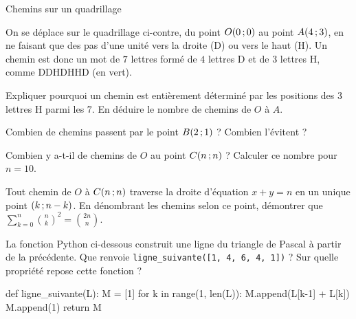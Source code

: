 \begin{exercice}[3]{Chemins sur un quadrillage}
\noindent
\begin{minipage}[t]{0.62\linewidth}\vspace{0pt}\raggedright
On se déplace sur le quadrillage ci-contre, du point $O(0\,{;}\,0)$ au point $A(4\,{;}\,3)$, en ne faisant que des pas d'une unité vers la
droite (D) ou vers le haut (H). Un chemin est donc un mot de $7$ lettres formé de $4$ lettres D et de $3$ lettres H, comme
DDHDHHD (en vert).
\end{minipage}\hfill
\begin{minipage}[t]{0.34\linewidth}\vspace{0pt}
\centering
{}
\end{minipage}
\begin{questions}
  \item Expliquer pourquoi un chemin est entièrement déterminé par les positions des $3$ lettres H parmi les $7$. En déduire le
    nombre de chemins de $O$ à $A$.
  \item Combien de chemins passent par le point $B(2\,{;}\,1)$ ? Combien l'évitent ?
  \item Combien y a-t-il de chemins de $O$ au point $C(n\,{;}\, n)$ ? Calculer ce nombre pour $n=10$.
  \item Tout chemin de $O$ à $C(n\,{;}\, n)$ traverse la droite d'équation $x+y=n$ en un unique point $(k\,{;}\, n-k)$. En dénombrant les
    chemins selon ce point, démontrer que $\displaystyle\sum_{k=0}^{n}\binom nk^{2}=\binom{2n}{n}$.
  \item La fonction Python ci-dessous construit une ligne du triangle de Pascal à partir de la précédente. Que renvoie
    \texttt{ligne\_suivante([1, 4, 6, 4, 1])} ? Sur quelle propriété repose cette fonction ?
\begin{python}
def ligne_suivante(L):
    M = [1]
    for k in range(1, len(L)):
        M.append(L[k-1] + L[k])
    M.append(1)
    return M
\end{python}
\end{questions}
\end{exercice}

